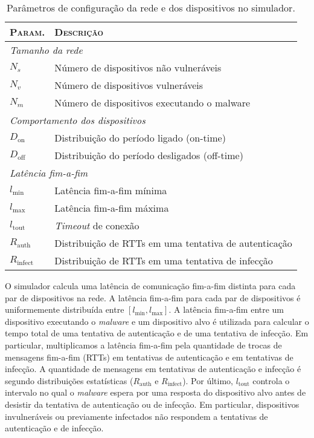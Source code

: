 \begin{table}
	\begin{center}
		\begin{tabular}{ll}
			\textsc{Param.} & \textsc{Descrição} \\
			\hline
			\multicolumn{2}{l}{\emph{Tamanho da rede}} \\
			$N_s$ & Número de dispositivos não vulneráveis \\
			$N_v$ & Número de dispositivos vulneráveis \\
			$N_m$ & Número de dispositivos executando o malware \\
			\hline
			\multicolumn{2}{l}{\emph{Comportamento dos dispositivos}} \\
			$D_\textrm{on}$ & Distribuição do período ligado (on-time) \\
			$D_\textrm{off}$ & Distribuição do período desligados (off-time) \\
			\hline
			\multicolumn{2}{l}{\emph{Latência fim-a-fim}} \\
			$l_\textrm{min}$ & Latência fim-a-fim mínima \\
			$l_\textrm{max}$ & Latência fim-a-fim máxima \\
			$l_\textrm{tout}$ & \emph{Timeout} de conexão \\
			$R_\textrm{auth}$ & Distribuição de RTTs em uma tentativa de autenticação \\
			$R_\textrm{infect}$ & Distribuição de RTTs em uma tentativa de infecção \\
		\end{tabular}
		\caption{Parâmetros de configuração da rede e dos dispositivos no simulador.}
		\label{tab:sim.params}
	\end{center}
\end{table}

O simulador calcula uma latência de comunicação fim-a-fim distinta
para cada par de dispositivos na rede. A latência fim-a-fim para
cada par de dispositivos é uniformemente distribuída entre
$[l_\textrm{min}, l_\textrm{max}]$.  A latência fim-a-fim entre um
dispositivo executando o \emph{malware} e um dispositivo alvo
é utilizada para calcular o tempo total de uma tentativa de
autenticação e de uma tentativa de infecção.  Em particular,
multiplicamos a latência fim-a-fim pela quantidade de trocas de
mensagens fim-a-fim (RTTs) em tentativas de autenticação e em
tentativas de infecção.  A quantidade de mensagens em tentativas de
autenticação e infecção é segundo distribuições estatísticas
($R_\textrm{auth}$ e $R_\textrm{infect}$).  Por último,
$l_\textrm{tout}$ controla o intervalo no qual o \emph{malware}
espera por uma resposta do dispositivo alvo antes de desistir da
tentativa de autenticação ou de infecção.  Em particular,
dispositivos invulneráveis ou previamente infectados não respondem
a tentativas de autenticação e de infecção.

